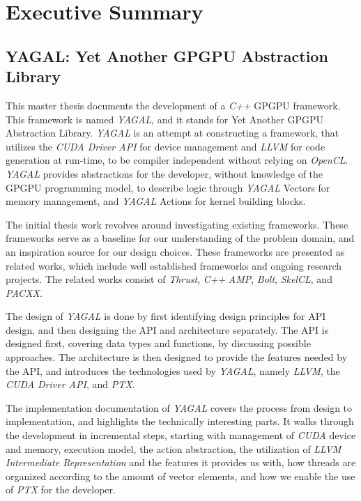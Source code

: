 


\chapter*{Executive Summary}
\section*{YAGAL: Yet Another GPGPU Abstraction Library}
This master thesis documents the development of a \textit{C++} GPGPU framework. This framework is named \textit{YAGAL}, and it stands for Yet Another GPGPU Abstraction Library. \textit{YAGAL} is an attempt at constructing a framework, that utilizes the \textit{CUDA Driver API} for device management and \textit{LLVM} for code generation at run-time, to be compiler independent without relying on \textit{OpenCL}. \textit{YAGAL} provides abstractions for the developer, without knowledge of the GPGPU programming model, to describe logic through \textit{YAGAL} Vectors for memory management, and \textit{YAGAL} Actions for kernel building blocks.

The initial thesis work revolves around investigating existing frameworks. These frameworks serve as a baseline for our understanding of the problem domain, and an inspiration source for our design choices. These frameworks are presented as related works, which include well established frameworks and ongoing research projects. The related works consist of \textit{Thrust}, \textit{C++} \textit{AMP}, \textit{Bolt}, \textit{SkelCL}, and \textit{PACXX}. 

The design of \textit{YAGAL} is done by first identifying design principles for API design, and then designing the API and architecture separately. The API is designed first, covering data types and functions, by discussing possible approaches. The architecture is then designed to provide the features needed by the API, and introduces the technologies used by \textit{YAGAL}, namely \textit{LLVM}, the \textit{CUDA Driver API}, and \textit{PTX}.

The implementation documentation of \textit{YAGAL} covers the process from design to implementation, and highlights the technically interesting parts. It walks through the development in incremental steps, starting with management of \textit{CUDA} device and memory, execution model, the action abstraction, the utilization of \textit{LLVM Intermediate Representation} and the features it provides us with, how threads are organized according to the amount of vector elements, and how we enable the use of \textit{PTX} for the developer. 

